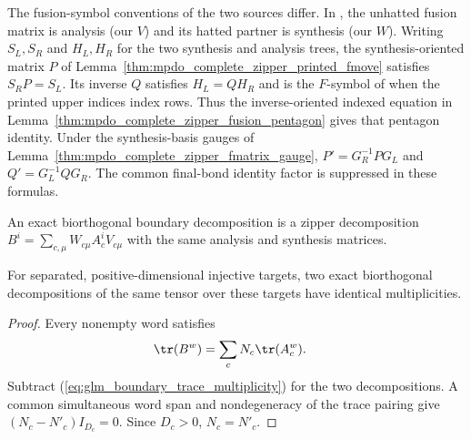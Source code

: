 The fusion-symbol conventions of the two sources differ. In
\cite[Section~2]{GarreRubio2023MPOSym}, the unhatted fusion matrix is
analysis (our $V$) and its hatted partner is synthesis (our $W$).
Writing $S_L,S_R$ and $H_L,H_R$ for the two synthesis and analysis trees,
the synthesis-oriented matrix $P$ of
Lemma~\ref{thm:mpdo_complete_zipper_printed_fmove} satisfies
$S_RP=S_L$. Its inverse $Q$ satisfies $H_L=QH_R$ and is the
$F$-symbol of \cite{GarreRubio2023MPOSym} when the printed upper indices
index rows. Thus the inverse-oriented indexed equation in
Lemma~\ref{thm:mpdo_complete_zipper_fusion_pentagon} gives that
pentagon identity. Under the synthesis-basis gauges of
Lemma~\ref{thm:mpdo_complete_zipper_fmatrix_gauge},
$P'=G_R^{-1}PG_L$ and $Q'=G_L^{-1}QG_R$.
The common final-bond identity factor is suppressed in these formulas.

\begin{definition}
    \leanok
    \label{def:glm_boundary_existing_zipper}
    An exact biorthogonal boundary decomposition is a zipper decomposition
    $B^i=\sum_{c,\mu}W_{c\mu}A_c^iV_{c\mu}$ with the same analysis and
    synthesis matrices.
\end{definition}

\begin{lemma}
    \leanok
    \label{thm:glm_boundary_multiplicity_unique}
    For separated, positive-dimensional injective targets, two exact
    biorthogonal decompositions of the same tensor over these targets
    have identical multiplicities.
\end{lemma}
\begin{proof}
    \leanok
    Every nonempty word satisfies
    \begin{align}
        \tr(B^w) & =\sum_cN_c\tr(A_c^w).
        \label{eq:glm_boundary_trace_multiplicity}
    \end{align}
    Subtract (\ref{eq:glm_boundary_trace_multiplicity}) for the two
    decompositions. A common simultaneous word span and nondegeneracy of
    the trace pairing give $(N_c-N'_c)I_{D_c}=0$. Since $D_c>0$,
    $N_c=N'_c$.
\end{proof}

